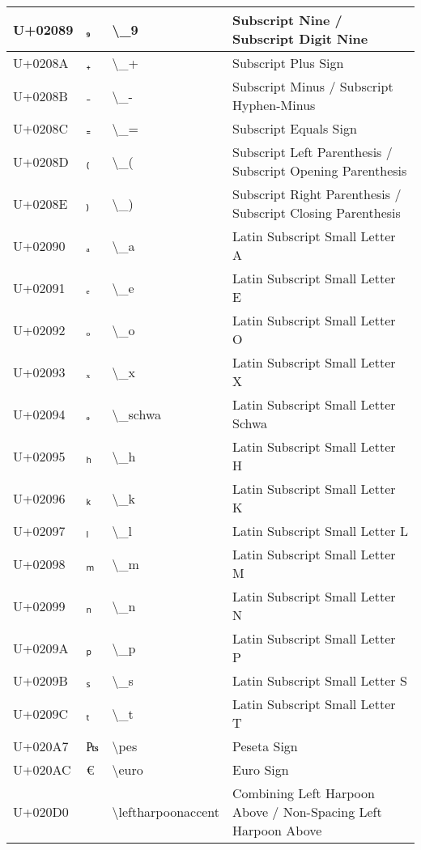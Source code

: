 \begin{table}[h]
\begin{tabulary}{\linewidth}{|L|L|L|L|}
\hline
U+02089 & ₉ & {\textbackslash}\_9 & Subscript Nine / Subscript Digit Nine \\
\hline
U+0208A & ₊ & {\textbackslash}\_+ & Subscript Plus Sign \\
\hline
U+0208B & ₋ & {\textbackslash}\_- & Subscript Minus / Subscript Hyphen-Minus \\
\hline
U+0208C & ₌ & {\textbackslash}\_= & Subscript Equals Sign \\
\hline
U+0208D & ₍ & {\textbackslash}\_( & Subscript Left Parenthesis / Subscript Opening Parenthesis \\
\hline
U+0208E & ₎ & {\textbackslash}\_) & Subscript Right Parenthesis / Subscript Closing Parenthesis \\
\hline
U+02090 & ₐ & {\textbackslash}\_a & Latin Subscript Small Letter A \\
\hline
U+02091 & ₑ & {\textbackslash}\_e & Latin Subscript Small Letter E \\
\hline
U+02092 & ₒ & {\textbackslash}\_o & Latin Subscript Small Letter O \\
\hline
U+02093 & ₓ & {\textbackslash}\_x & Latin Subscript Small Letter X \\
\hline
U+02094 & ₔ & {\textbackslash}\_schwa & Latin Subscript Small Letter Schwa \\
\hline
U+02095 & ₕ & {\textbackslash}\_h & Latin Subscript Small Letter H \\
\hline
U+02096 & ₖ & {\textbackslash}\_k & Latin Subscript Small Letter K \\
\hline
U+02097 & ₗ & {\textbackslash}\_l & Latin Subscript Small Letter L \\
\hline
U+02098 & ₘ & {\textbackslash}\_m & Latin Subscript Small Letter M \\
\hline
U+02099 & ₙ & {\textbackslash}\_n & Latin Subscript Small Letter N \\
\hline
U+0209A & ₚ & {\textbackslash}\_p & Latin Subscript Small Letter P \\
\hline
U+0209B & ₛ & {\textbackslash}\_s & Latin Subscript Small Letter S \\
\hline
U+0209C & ₜ & {\textbackslash}\_t & Latin Subscript Small Letter T \\
\hline
U+020A7 & ₧ & {\textbackslash}pes & Peseta Sign \\
\hline
U+020AC & € & {\textbackslash}euro & Euro Sign \\
\hline
U+020D0 &  ⃐  & {\textbackslash}leftharpoonaccent & Combining Left Harpoon Above / Non-Spacing Left Harpoon Above \\

\end{tabulary}
\end{table}
